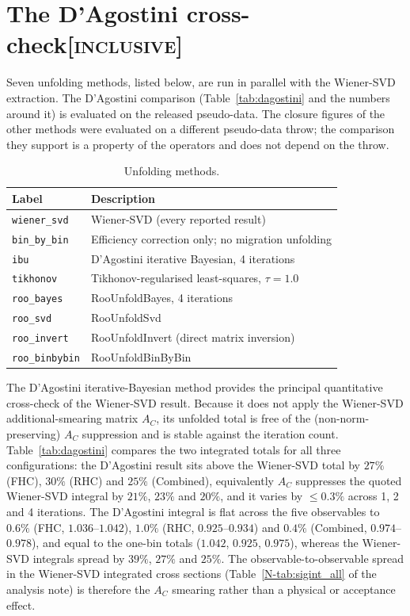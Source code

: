 \documentclass[11pt,a4paper]{article}
\newcommand{\noteref}[2]{#1~\ref{N-#2} of the analysis note}
\newcommand{\scopetag}[1]{\hfill{\normalfont\small\textsc{[#1]}}}
\begin{document}
\section[The D'Agostini cross-check]{The D'Agostini cross-check\scopetag{inclusive}}
\label{sec:crosschecks}

Seven unfolding methods, listed below, are run in parallel with the Wiener-SVD extraction. The D'Agostini comparison (Table~\ref{tab:dagostini} and the
numbers around it) is evaluated on the released pseudo-data. The closure figures of the other
methods were evaluated on a different pseudo-data throw; the comparison they support is a
property of the operators and does not depend on the throw.

\begin{table}[H]
  \centering
  \caption{Unfolding methods.}
  \label{tab:methods}
  \begin{tabular}{ll}
    \toprule
    Label & Description \\
    \midrule
    \texttt{wiener\_svd}   & Wiener-SVD (every reported result) \\
    \texttt{bin\_by\_bin}  & Efficiency correction only; no migration unfolding \\
    \texttt{ibu}           & D'Agostini iterative Bayesian, 4 iterations \\
    \texttt{tikhonov}      & Tikhonov-regularised least-squares, $\tau = 1.0$ \\
    \texttt{roo\_bayes}    & RooUnfoldBayes, 4 iterations \\
    \texttt{roo\_svd}      & RooUnfoldSvd \\
    \texttt{roo\_invert}   & RooUnfoldInvert (direct matrix inversion) \\
    \texttt{roo\_binbybin} & RooUnfoldBinByBin \\
    \bottomrule
  \end{tabular}
\end{table}

The D'Agostini iterative-Bayesian method provides the principal quantitative
cross-check of the Wiener-SVD result. Because it does not apply the Wiener-SVD
additional-smearing matrix $A_C$, its unfolded total is free of the
(non-norm-preserving) $A_C$ suppression and is stable against the iteration count.
Table~\ref{tab:dagostini} compares the two integrated totals for all three
configurations: the D'Agostini result sits above the Wiener-SVD total by
$27\%$ (FHC), $30\%$ (RHC) and $25\%$ (Combined), equivalently $A_C$ suppresses the
quoted Wiener-SVD integral by $21\%$, $23\%$ and $20\%$, and it varies by $\le0.3\%$
across 1, 2 and 4 iterations. The D'Agostini integral is flat across the five observables
to $0.6\%$ (FHC, $1.036$--$1.042$), $1.0\%$ (RHC, $0.925$--$0.934$) and $0.4\%$
(Combined, $0.974$--$0.978$), and equal to the one-bin totals ($1.042$, $0.925$, $0.975$),
whereas the Wiener-SVD integrals spread by $39\%$, $27\%$ and $25\%$.
The observable-to-observable spread in the Wiener-SVD integrated
cross sections (\noteref{Table}{tab:sigint_all}) is therefore the $A_C$ smearing rather than a
physical or acceptance effect.
\end{document}
